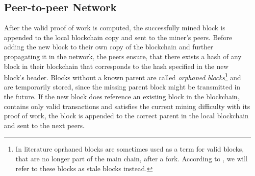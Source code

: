 \documentclass[a4paper,12pt,twoside]{report}
\begin{document}
\subsection{Peer-to-peer Network}
After the valid proof of work is computed, the successfully mined block is appended to the local blockchain copy and sent to the miner's peers. Before adding the new block to their own copy of the blockchain and further propagating it in the network, the peers ensure, that there exists a hash of any block in their blockchain that corresponds to the hash specified in the new block's header. Blocks without a known parent are called \textit{orphaned blocks}\footnote{In literature oprhaned blocks are sometimes used as a term for valid blocks, that are no longer part of the main chain, after a fork. According to \cite{staleblocks}, we will refer to these blocks as stale blocks instead.} and are temporarily stored, since the missing parent block might be transmitted in the future. If the new block does reference an existing block in the blockchain, contains only valid transactions and satisfies the current mining difficulty with its proof of work, the block is appended to the correct parent in the local blockchain and sent to the next peers. 
\end{document}
